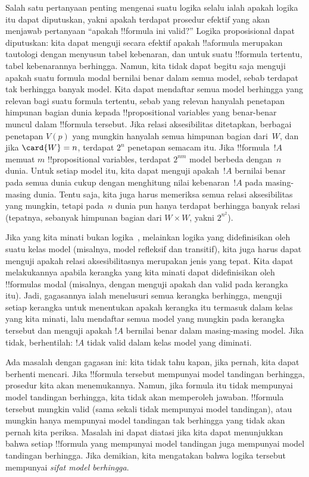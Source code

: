 \documentclass[../../../include/open-logic-section]{subfiles}
\begin{document}


Salah satu pertanyaan penting mengenai suatu logika selalu ialah apakah logika
itu dapat diputuskan, yakni apakah terdapat prosedur efektif yang akan menjawab
pertanyaan ``apakah !!{formula} ini valid?'' Logika proposisional dapat
diputuskan: kita dapat menguji secara efektif apakah !!a{formula} merupakan
tautologi dengan menyusun tabel kebenaran, dan untuk suatu !!{formula} tertentu,
tabel kebenarannya berhingga. Namun, kita tidak dapat begitu saja menguji apakah
suatu formula modal bernilai benar dalam semua model, sebab terdapat tak
berhingga banyak model. Kita dapat mendaftar semua model berhingga yang relevan
bagi suatu formula tertentu, sebab yang relevan hanyalah penetapan himpunan
bagian dunia kepada !!{propositional variable}s yang benar-benar muncul dalam
!!{formula} tersebut. Jika relasi aksesibilitas ditetapkan, berbagai penetapan
$V(p)$ yang mungkin hanyalah semua himpunan bagian dari~$W$, dan jika
$\card{W} = n$, terdapat $2^n$ penetapan semacam itu. Jika !!{formula}~$!A$
memuat $m$ !!{propositional variable}s, terdapat $2^{nm}$ model berbeda
dengan~$n$ dunia. Untuk setiap model itu, kita dapat menguji apakah~$!A$
bernilai benar pada semua dunia cukup dengan menghitung nilai kebenaran~$!A$
pada masing-masing dunia. Tentu saja, kita juga harus memeriksa semua relasi
aksesibilitas yang mungkin, tetapi pada~$n$ dunia pun hanya terdapat berhingga
banyak relasi (tepatnya, sebanyak himpunan bagian dari $W \times W$, yakni
$2^{n^2}$).

Jika yang kita minati bukan logika~, melainkan logika yang didefinisikan
oleh suatu kelas model (misalnya, model refleksif dan transitif), kita juga
harus dapat menguji apakah relasi aksesibilitasnya merupakan jenis yang tepat. Kita dapat
melakukannya apabila kerangka yang kita minati dapat didefinisikan oleh
!!{formula}s modal (misalnya, dengan menguji apakah  dan  valid
pada kerangka itu). Jadi, gagasannya ialah menelusuri semua kerangka berhingga,
menguji setiap kerangka untuk menentukan apakah kerangka itu termasuk dalam
kelas yang kita minati, lalu mendaftar semua model yang mungkin pada kerangka
tersebut dan menguji apakah $!A$ bernilai benar dalam masing-masing model. Jika
tidak, berhentilah: $!A$ tidak valid dalam kelas model yang diminati.

Ada masalah dengan gagasan ini: kita tidak tahu kapan, jika pernah, kita dapat
berhenti mencari. Jika !!{formula} tersebut mempunyai model tandingan
berhingga, prosedur kita akan menemukannya. Namun, jika formula itu tidak
mempunyai model tandingan berhingga, kita tidak akan memperoleh jawaban.
!!{formula} tersebut mungkin valid (sama sekali tidak mempunyai model
tandingan), atau mungkin hanya mempunyai model tandingan tak berhingga yang
tidak akan pernah kita periksa. Masalah ini dapat diatasi jika kita dapat
menunjukkan bahwa setiap !!{formula} yang mempunyai model tandingan juga
mempunyai model tandingan berhingga. Jika demikian, kita mengatakan bahwa
logika tersebut mempunyai \emph{sifat model berhingga}.
\end{document}

